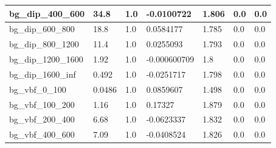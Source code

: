 \documentclass[a4paper, 10pt]{article}
\begin{document}
\begin{table}[H]
\begin{center}
\begin{tabular}{|m{23.0mm}|m{23.0mm}|m{18.0mm}|m{19.0mm}|m{19.0mm}|m{19.0mm}|m{19.0mm}|}
      \hline
      {\cellcolor{white}         bg\_dip\_400\_600}& {\cellcolor{white}         34.8}& {\cellcolor{white}         1.0}& {\cellcolor{white}         -0.0100722}& {\cellcolor{white}         1.806}& {\cellcolor{green}         0.0}& {\cellcolor{green}         0.0}\\
      \hline
      {\cellcolor{white}         bg\_dip\_600\_800}& {\cellcolor{white}         18.8}& {\cellcolor{white}         1.0}& {\cellcolor{white}         0.0584177}& {\cellcolor{white}         1.785}& {\cellcolor{green}         0.0}& {\cellcolor{green}         0.0}\\
      \hline
      {\cellcolor{white}         bg\_dip\_800\_1200}& {\cellcolor{white}         11.4}& {\cellcolor{white}         1.0}& {\cellcolor{white}         0.0255093}& {\cellcolor{white}         1.793}& {\cellcolor{green}         0.0}& {\cellcolor{green}         0.0}\\
      \hline
      {\cellcolor{white}         bg\_dip\_1200\_1600}& {\cellcolor{white}         1.92}& {\cellcolor{white}         1.0}& {\cellcolor{white}         -0.000600709}& {\cellcolor{white}         1.8}& {\cellcolor{green}         0.0}& {\cellcolor{green}         0.0}\\
      \hline
      {\cellcolor{white}         bg\_dip\_1600\_inf}& {\cellcolor{white}         0.492}& {\cellcolor{white}         1.0}& {\cellcolor{white}         -0.0251717}& {\cellcolor{white}         1.798}& {\cellcolor{green}         0.0}& {\cellcolor{green}         0.0}\\
      \hline
      {\cellcolor{white}         bg\_vbf\_0\_100}& {\cellcolor{white}         0.0486}& {\cellcolor{white}         1.0}& {\cellcolor{white}         0.0859607}& {\cellcolor{white}         1.498}& {\cellcolor{green}         0.0}& {\cellcolor{green}         0.0}\\
      \hline
      {\cellcolor{white}         bg\_vbf\_100\_200}& {\cellcolor{white}         1.16}& {\cellcolor{white}         1.0}& {\cellcolor{white}         0.17327}& {\cellcolor{white}         1.879}& {\cellcolor{green}         0.0}& {\cellcolor{green}         0.0}\\
      \hline
      {\cellcolor{white}         bg\_vbf\_200\_400}& {\cellcolor{white}         6.68}& {\cellcolor{white}         1.0}& {\cellcolor{white}         -0.0623337}& {\cellcolor{white}         1.832}& {\cellcolor{green}         0.0}& {\cellcolor{green}         0.0}\\
      \hline
      {\cellcolor{white}         bg\_vbf\_400\_600}& {\cellcolor{white}         7.09}& {\cellcolor{white}         1.0}& {\cellcolor{white}         -0.0408524}& {\cellcolor{white}         1.826}& {\cellcolor{green}         0.0}& {\cellcolor{green}         0.0}\\

\end{tabular}
\end{center}
\end{table}
\end{document}
